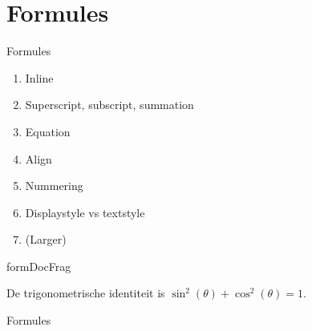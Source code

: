 \documentclass[../presentatie.tex]{subfiles}
\begin{document}
\section{Formules}

\clearrecentlist
    
\begin{frame}{Formules}
	\begin{enumerate}
		\item Inline
		\item Superscript, subscript, summation
		\item Equation
		\item Align
		\item Nummering
		\item Displaystyle vs textstyle
		\item (Larger)
	\end{enumerate}
\end{frame}



\begin{saveblock}{formDocFrag}
	\begin{highlightblock}[gobble=8,linewidth=25em,framexleftmargin=0.25em]
		De trigonometrische identiteit
		is $ \sin^2(\theta) + \cos^2(\theta) = 1 $.
	\end{highlightblock}
\end{saveblock}

\begin{frame}{Formules}
	\centering
	
	\vspace{10pt}
	\begin{center}%
	\end{center}
	
\end{frame}

\def\extraslistsep{\hspace{0.5em}\textcolor{red!80!black}{\vrule width 1pt height 0.6\baselineskip\relax}\hspace{0.5em}}
\def\es#1{\adjustbox{scale=0.8}{#1}}
\end{document}
